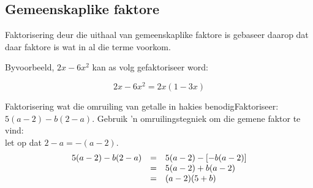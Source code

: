 \par 
{}

\subsection*{Gemeenskaplike faktore}
\nopagebreak
Faktorisering deur die uithaal van gemeenskaplike faktore is gebaseer daarop dat daar faktore is wat in al die terme voorkom. \par

Byvoorbeeld, $2x-6{x}^{2}$ kan as volg gefaktoriseer word:\par 

\begin{equation*}
2x-6{x}^{2}=2x(1-3x)
\end{equation*}


% 


\begin{wex}{ Faktorisering wat die omruiling van getalle in hakies benodig}{Faktoriseer: $5(a-2)-b(2-a)$. }{
Gebruik 'n omruilingstegniek om die gemene faktor te vind: \\let op dat $2-a = -(a-2)$.
\begin{equation*}
\begin{array}{ccl}
\hfill 5(a-2)-b(2-a)& =& \hfill 5(a-2)-[-b(a-2)]  \\
&= & 5(a-2)+b(a-2)\\ 
& =& (a-2)(5+b) \hfill
\end{array}
\end{equation*}
}
\end{wex}

